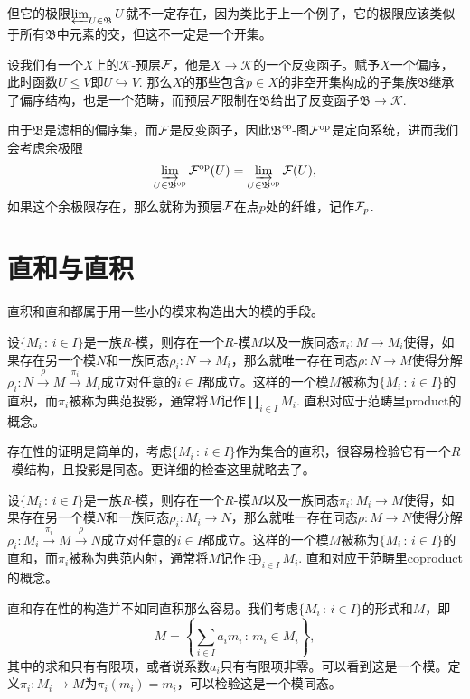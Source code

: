 但它的极限$\varprojlim_{U\in \mathfrak{B}} U$就不一定存在，因为类比于上一个例子，它的极限应该类似于所有$\mathfrak{B}$中元素的交，但这不一定是一个开集。

\para 设我们有一个$X$上的$\mathcal{K}$-预层$\mathcal{F}$，他是$X\to \mathcal{K}$的一个反变函子。赋予$X$一个偏序，此时函数$U\leq V$即$U\hookrightarrow V$. 那么$X$的那些包含$p\in X$的非空开集构成的子集族$\mathfrak{B}$继承了偏序结构，也是一个范畴，而预层$\mathcal{F}$限制在$\mathfrak{B}$给出了反变函子$\mathfrak{B}\to \mathcal{K}$.

由于$\mathfrak{B}$是滤相的偏序集，而$\mathcal{F}$是反变函子，因此$\mathfrak{B}^{\mathrm{op}}$-图$\mathcal{F}^{\mathrm{op}}$是定向系统，进而我们会考虑余极限
\[
	\varinjlim_{U\in \mathfrak{B}^{\mathrm{op}}} \mathcal{F}^{\mathrm{op}}(U)=\varinjlim_{U\in \mathfrak{B}^{\mathrm{op}}} \mathcal{F}(U),
\]
如果这个余极限存在，那么就称为预层$\mathcal{F}$在点$p$处的纤维，记作$\mathcal{F}_p$.

\section{直和与直积}

直积和直和都属于用一些小的模来构造出大的模的手段。

\para 设$\{M_i\,:\, i\in I\}$是一族$R$-模，则存在一个$R$-模$M$以及一族同态$\pi_i:M\to M_i$使得，如果存在另一个模$N$和一族同态$\rho_i:N\to M_i$，那么就唯一存在同态$\rho:N\to M$使得分解$\rho_i:N\xrightarrow{\rho} M \xrightarrow{\pi_i} M_i$成立对任意的$i\in I$都成立。这样的一个模$M$被称为$\{M_i\,:\, i\in I\}$的直积，而$\pi_i$被称为典范投影，通常将$M$记作$\prod_{i\in I}M_i$. 直积对应于范畴里product的概念。

存在性的证明是简单的，考虑$\{M_i\,:\, i\in I\}$作为集合的直积，很容易检验它有一个$R$-模结构，且投影是同态。更详细的检查这里就略去了。


\para 设$\{M_i\,:\, i\in I\}$是一族$R$-模，则存在一个$R$-模$M$以及一族同态$\pi_i:M_i\to M$使得，如果存在另一个模$N$和一族同态$\rho_i:M_i\to N$，那么就唯一存在同态$\rho:M\to N$使得分解$\rho_i:M_i\xrightarrow{\pi_i} M \xrightarrow{\rho} N$成立对任意的$i\in I$都成立。这样的一个模$M$被称为$\{M_i\,:\, i\in I\}$的直和，而$\pi_i$被称为典范内射，通常将$M$记作$\bigoplus_{i\in I}M_i$. 直和对应于范畴里coproduct的概念。

直和存在性的构造并不如同直积那么容易。我们考虑$\{M_i\,:\, i\in I\}$的形式和$M$，即
\[
	M=\left\{\sum_{i\in I} a_i m_i\,:\, m_i\in M_i\right\},
\]
其中的求和只有有限项，或者说系数$a_i$只有有限项非零。可以看到这是一个模。定义$\pi_i:M_i\to M$为$\pi_i(m_i)=m_i$，可以检验这是一个模同态。

